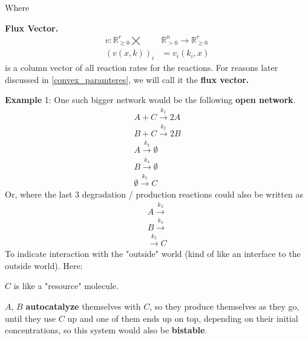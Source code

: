 Where
\begin{definition}\label{flux_vector}
	\textbf{Flux Vector.}
	\begin{align}
		v : \mathbb{R}^r_{\geq 0}  \bigtimes &\mathbb{R}^n_{> 0} \rightarrow \mathbb{R}^r_{\geq 0}  \nonumber \\
		(v(x,k))_{i} &= v_i(k_i, x)
	\end{align}
	is a column vector of all reaction rates for the reactions. For reasons later discussed in \ref{convex_paramteres}, we will call it the \textbf{flux vector.}
\end{definition}

\newpage
\textbf{Example}\label{bigger_network_example1} 1:
One such bigger network would be the following \textbf{open network}.
\begin{align*}
	A + C \xrightarrow{k_{1}} 2A \\
	B + C \xrightarrow{k_{2}} 2B  \\
	A \xrightarrow{k_{3}} \emptyset \\
	B \xrightarrow{k_{4}} \emptyset \\
	\emptyset \xrightarrow{k_{5}} C
\end{align*}
Or, where the last $3$ degradation / production reactions could also be written as
\begin{align*}
	A \xrightarrow{k_{3}} \\
	B \xrightarrow{k_{4}} \\
	\xrightarrow{k_{5}} C	
\end{align*}
To indicate interaction with the "outside" world (kind of like an interface to the outside world).
Here: 	

$C$ is like a "resource" molecule.

$A$, $B$ \textbf{autocatalyze} themselves with $C$, so they produce themselves as they go, until they use $C$ up and one of them ends up on top, depending on their initial concentrations, so this system would also be \textbf{bistable}.


